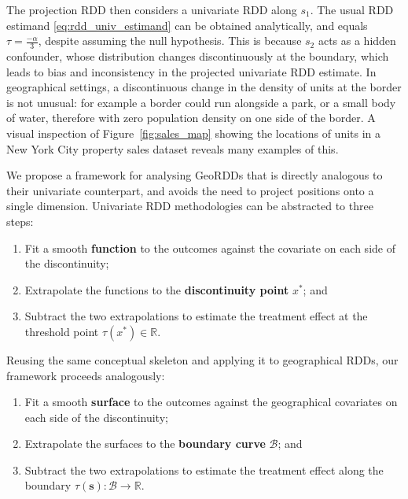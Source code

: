 \documentclass[letter]{article}
\providecommand{\tightlist}{%
      \setlength{\itemsep}{0pt}\setlength{\parskip}{0pt}}
\newcommand{\svec}{\mathbold{s}}
\newcommand{\boundary}{\mathcal{B}}
\providecommand{\tightlist}{%
  	  \setlength{\itemsep}{0pt}\setlength{\parskip}{0pt}}
\begin{document}
The projection RDD then considers a univariate RDD along \(s_1\).
The usual RDD estimand \eqref{eq:rdd_univ_estimand} can be obtained analytically, and equals \(\tau=\frac{-\alpha}{3}\), despite assuming the null hypothesis.
This is because \(s_2\) acts as a hidden confounder, whose distribution changes discontinuously at the boundary, which leads to bias and inconsistency in the projected univariate RDD estimate.
In geographical settings, a discontinuous change in the density of units at the border is not unusual: for example a border could run alongside a park, or a small body of water, therefore with zero population density on one side of the border.
A visual inspection of Figure~\ref{fig:sales_map} showing the locations of units in a New York City property sales dataset reveals many examples of this.
    


    	We propose a framework for analysing GeoRDDs that is directly analogous to their univariate counterpart, and avoids the need to project positions onto a single dimension.
Univariate RDD methodologies can be abstracted to three steps:

\begin{enumerate}
\def\labelenumi{\arabic{enumi}.}
\tightlist
\item
  Fit a smooth \textbf{function} to the outcomes against the covariate on each side of the discontinuity;
\item
  Extrapolate the functions to the \textbf{discontinuity point} \(x^*\); and
\item
  Subtract the two extrapolations to estimate the treatment effect at the threshold point \(\tau(x^*) \in \mathbb{R}\).
\end{enumerate}

Reusing the same conceptual skeleton and applying it to geographical RDDs, our framework proceeds analogously:

\begin{enumerate}
\def\labelenumi{\arabic{enumi}.}
\tightlist
\item
  Fit a smooth \textbf{surface} to the outcomes against the geographical covariates on each side of the discontinuity;
\item
  Extrapolate the surfaces to the \textbf{boundary curve} \(\boundary\); and
\item
  Subtract the two extrapolations to estimate the treatment effect along the boundary \(\tau(\svec): \boundary \rightarrow \mathbb{R}\).
\end{enumerate}
    
\end{document}
